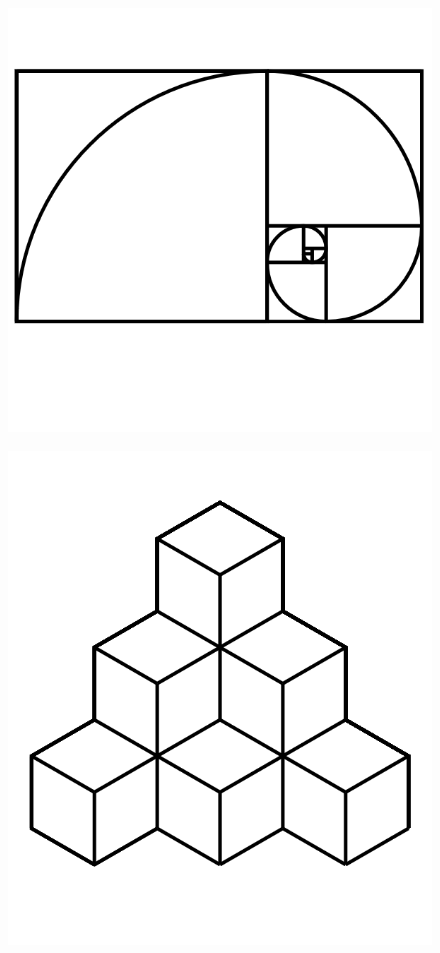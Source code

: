 \documentclass[17pt]{extreport}
\begin{document}
	\begin{figure}
		\centering
		\includegraphics[width=6.25in]{imageserver/uploadimages/image18.png}		
	\end{figure}
	\begin{figure}
		\centering
		\includegraphics[width=6.25in]{imageserver/uploadimages/qubert.png}
	\end{figure}
\end{document}
